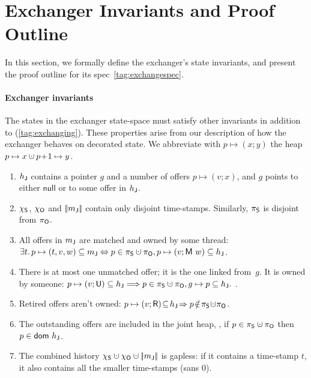 
\section{Exchanger Invariants and Proof Outline}
\label{app:exch}

In this section, we formally define the exchanger's state invariants,
and present the proof outline for its spec~\eqref{tag:exchangespec}.

\paragraph{Exchanger invariants}
%

The states in the exchanger state-space must satisfy other invariants
in addition to (\ref{tag:exchanging}). These properties arise from our
description of how the exchanger behaves on decorated state. We
abbreviate with $p \mapsto (x; y)$ the heap
$p \mapsto x \hunion p\!+\!1 \mapsto y$.

\begin{enumerate}[label=(\roman*)]
\item\label{exP} $h_{\mathsf{J}}$ contains a pointer $g$ and a number of
  offers $p \mapsto (v; x)$, and $g$ points to either $\mathsf{null}$
  or to some offer in $h_{\mathsf{J}}$.

\item $\chi_{\mathsf{S}}$, $\chi_{\mathsf{O}}$ and $|\!|{{m_{\mathsf{J}}}}|\!|$ contain only
  disjoint time-stamps. Similarly, $\pi_{\mathsf{S}}$ is disjoint from $\pi_{\mathsf{O}}$.

\item\label{matched} All offers in ${m_{\mathsf{J}}}$ are matched and owned
  by some thread:
%
  {\small$\exists t\ldot p \mapsto (t, v, w) \subseteq \pending
    \Leftrightarrow p \in \perms \hunion \permo, p \mapsto (v;
    \Matched w) \subseteq \heapj $}.

\item There is at most one unmatched offer; it is the one linked
  from~$g$. It is owned by someone:
%
  {\small{
      $p \mapsto (v; \Unmatched) \subseteq \heapj \Longrightarrow p
      \in \perms \hunion \permo, g \mapsto p \subseteq \heapj.  $ }}.

\item Retired offers aren't owned:
  {\small{$p \mapsto (v; \Retired)\!\subseteq\!\heapj\!\Rightarrow
    p\!\notin\!\perms\!\hunion\!\permo$}}.

\item The outstanding offers are included in the joint heap, \ie, if
  $p \in \perms \hunion \permo$ then $p \in \mathsf{dom}\ h_{\mathsf{J}}$.

\item\label{ex:gapless} The combined history
  $\hists \hunion \histo \hunion \mygather{\pending}$ is gapless: if
  it contains a time-stamp $t$, it also contains all the smaller
  time-stamps (sans 0).

\end{enumerate}

